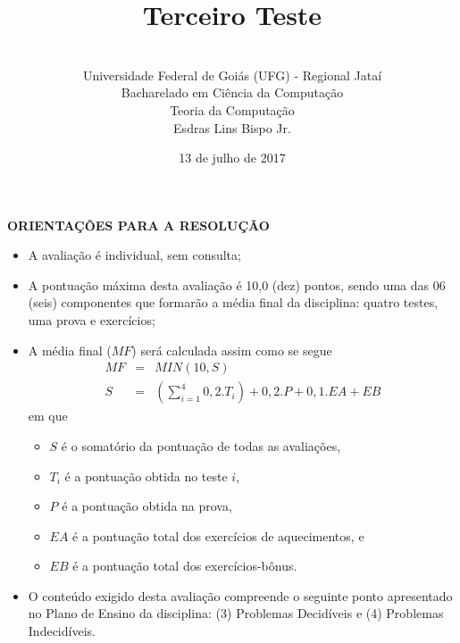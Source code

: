 \documentclass[12pt,a4paper,oneside]{article}
\author{\\Universidade Federal de Goiás (UFG) - Regional  Jataí\\Bacharelado em Ciência da Computação \\Teoria da Computação \\Esdras Lins Bispo Jr.}
\date{13 de julho de 2017}
\title{\sc \huge Terceiro Teste}
\begin{document}
\maketitle

{\bf ORIENTAÇÕES PARA A RESOLUÇÃO}

\small
 
\begin{itemize}
	\item A avaliação é individual, sem consulta;
	\item A pontuação máxima desta avaliação é 10,0 (dez) pontos, sendo uma das 06 (seis) componentes que formarão a média final da disciplina: quatro testes, uma prova e exercícios;
	\item A média final ($MF$) será calculada assim como se segue
	\begin{eqnarray}
		MF & = & MIN(10, S) \nonumber \\
		S & = & (\sum_{i=1}^{4} 0,2.T_i ) + 0,2.P  + 0,1.EA + EB\nonumber
	\end{eqnarray}
	em que 
	\begin{itemize}
		\item $S$ é o somatório da pontuação de todas as avaliações,
		\item $T_i$ é a pontuação obtida no teste $i$,
		\item $P$ é a pontuação obtida na prova,
		\item $EA$ é a pontuação total dos exercícios de aquecimentos, e
		\item $EB$ é a pontuação total dos exercícios-bônus.
	\end{itemize}
	\item O conteúdo exigido desta avaliação compreende o seguinte ponto apresentado no Plano de Ensino da disciplina:  (3) Problemas Decidíveis e (4) Problemas Indecidíveis.
\end{itemize}

\begin{center}
\end{center}\newpage
\end{document}
